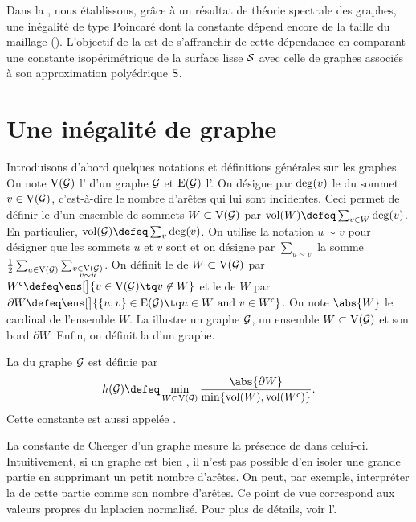 Dans la , nous établissons, grâce à un résultat de théorie spectrale des graphes, une inégalité de type Poincaré  dont la constante dépend encore de la taille du maillage (). L'objectif de la  est de s'affranchir de cette dépendance en comparant une constante isopérimétrique de la surface lisse $\mathcal{S}$ avec celle de graphes associés à son approximation polyédrique $\mathrm{S}$. 

\section{Une inégalité de graphe} \label{subsec:une_inegalite_de_graphe}

Introduisons d'abord quelques notations et définitions générales sur les graphes. On note $\mathrm{V}(\mathcal{G})$ l' d'un graphe $\mathcal{G}$ et $\mathrm{E}(\mathcal{G})$ l'. On désigne par $\operatorname{deg}(v)$ le  du sommet $v \in \mathrm{V}(\mathcal{G})$, c'est-à-dire le nombre d'arêtes qui lui sont incidentes. Ceci permet de définir le  d'un ensemble de sommets $W \subset \mathrm{V}(\mathcal{G})$ par $\vol(W) \defeq \sum_{v \in W} \degr(v)$. En particulier, $\vol(\graphe) \defeq \sum_v \degr(v)$. On utilise la notation $u \sim v$ pour désigner que les sommets $u$ et $v$ sont  et on désigne par $\sum_{u \sim v}$ la somme $\frac{1}{2} \sum_{u \in \mathrm{V}(\mathcal{G})} \sum_{\substack{v \in \mathrm{V}(\mathcal{G}) \\ v \sim u}}$. On définit le  de $W \subset \mathrm{V}(\mathcal{G})$ par $\comp{W} \defeq \ens[\big]{v \in \vertices(\graphe) \tq v \not\in W}$ et le  de $W$ par $\partial W \defeq \ens[\big]{ \{u, v\} \in \edges(\graphe) \tq u \in W \text{ and } v \in \comp{W} }$. On note $\abs{W}$ le cardinal de l'ensemble $W$. La  illustre un graphe $\mathcal{G}$, un ensemble $W \subset \mathrm{V}(\mathcal{G})$ et son bord $\partial W$. Enfin, on définit la  d'un graphe. 
\begin{defi}
La  du graphe $\mathcal{G}$ est définie par
\begin{equation} \label{eq:cheeger_constant}
h(\graphe) \defeq \min_{W \subset \vertices(\graphe)}
\frac{\abs{\partial W}}{\min\{ \vol(W), \vol(\comp{W}) \}}.
\end{equation}
Cette constante est aussi appelée .
\end{defi}
La constante de Cheeger d'un graphe mesure la présence de  dans celui-ci. Intuitivement, si un graphe est bien , il n'est pas possible d'en isoler une grande partie en supprimant un petit nombre d'arêtes. On peut, par exemple, interpréter la  de cette partie comme son nombre d'arêtes. Ce point de vue correspond aux valeurs propres du laplacien normalisé. Pour plus de détails, voir l'. \\


